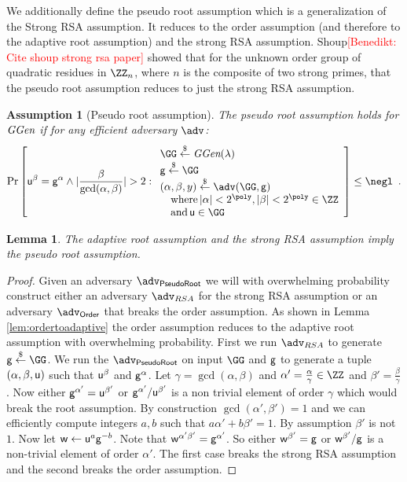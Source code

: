 \documentclass{article}
\newtheorem{lemma}{Lemma}
\newtheorem{assumption}{Assumption}
\newcommand{\benedikt}[1]{{\textcolor{red}{[Benedikt: #1]}}}
\newcommand{\benedikt}[1]{}
\begin{document}
	
We additionally define the pseudo root assumption which is a generalization of the Strong RSA assumption. It reduces to the order assumption (and therefore to the adaptive root assumption) and the strong RSA assumption. Shoup\benedikt{Cite shoup strong rsa paper} showed that for the unknown order group of quadratic residues in $\ZZ_n$, where $n$ is the composite of two strong primes, that the pseudo root assumption reduces to just the strong RSA assumption.
\begin{assumption}[Pseudo root assumption]
\label{assum:fracroot}
The pseudo root assumption holds for $\textit{GGen}$ if for any efficient adversary $\adv$:
\[        
                \Pr\left[\gr{u}^\beta = \gr{g}^{\alpha} \wedge \vert\frac{\beta}{\gcd(\alpha,\beta)}|>2   : 
                \begin{array}{l} 
                      \GG \sample \ggen(\lambda) \\ 
                      \gr{g} \sample \GG \\
                      (\alpha, \beta, y) \sample \adv(\GG, \gr{g}) \\
                      \quad \textnormal{where} \, |\alpha|<2^{\poly}, |\beta|<2^{\poly} \in \ZZ \\
                      \quad \textnormal{and} \, \gr{u} \in \GG 
                \end{array} 
        \right] \leq \negl \enspace .
\]
\end{assumption}
\begin{lemma}
	The adaptive root assumption and the strong RSA assumption imply the pseudo root assumption.
\end{lemma}
\begin{proof}
	Given an adversary $\adv_{\textsf{PseudoRoot}}$ we will with overwhelming probability construct either an adversary $\adv_{RSA}$ for the strong RSA assumption or an adversary $\adv_{\textsf{Order}}$ that breaks the order assumption. As shown in Lemma \ref{lem:ordertoadaptive} the order assumption reduces to the adaptive root assumption with overwhelming probability. 
	First we run $\adv_{RSA}$ to generate $\gr{g}\sample \GG$.
	We run the $\adv_{\textsf{PseudoRoot}}$ on input $\GG$ and $\mathsf{g}$ to generate a tuple $(\alpha,\beta,\mathsf{u})$ such that $\mathsf{u}^{\beta}$ and $\mathsf{g}^{\alpha}$. Let $\gamma=\gcd(\alpha,\beta)$ and $\alpha'=\frac{\alpha}{\gamma}\in \ZZ$ and  $\beta'=\frac{\beta}{\gamma}$. Now either $\mathsf{g}^{\alpha'}=\mathsf{u}^{\beta'}$ or $\mathsf{g}^{\alpha'}/\mathsf{u}^{\beta'}$ is a non trivial element of order $\gamma$ which would break the root assumption.
	By construction $\gcd(\alpha',\beta')=1$ and we can efficiently compute integers $a,b$ such that $a \alpha'+b \beta'=1$. By assumption $\beta'$ is not $1$. Now let $\mathsf{w}\gets \mathsf{u}^{a}\mathsf{g}^{-b}$. Note that $\mathsf{w}^{\alpha'\beta'}=\mathsf{g}^{\alpha'}$. So either $\mathsf{w}^{\beta'}=\mathsf{g}$ or $\mathsf{w}^{\beta'}/\mathsf{g}$ is a non-trivial element of order $\alpha'$. The first case breaks the strong RSA assumption and the second breaks the order assumption.
\end{proof}
\end{document}
